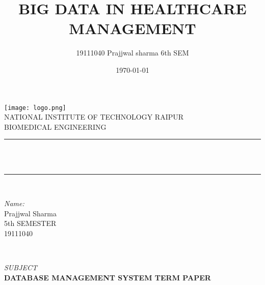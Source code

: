 \documentclass[12pt]{article}
\title{\normalsize BIG DATA IN HEALTHCARE MANAGEMENT}								%
\author{19111040 Prajjwal sharma 6th SEM}								%
\date{\today}											%
\makeatletter
\let\thetitle\@title
\makeatother
\begin{document}

\begin{titlepage}
	\centering
    \vspace*{0.5 cm}
    \texttt{[image: logo.png]}\\[1.0 cm]	%
    \textsc{\Large \newline NATIONAL INSTITUTE OF TECHNOLOGY RAIPUR}\\[2.0 cm]	%
	\textsc{\Large BIOMEDICAL ENGINEERING}
	\\[0.5 cm]				%
	\rule{\linewidth}{0.2 mm} \\[0.4 cm]
	{ \huge \bfseries \thetitle}\\
	\rule{\linewidth}{0.2 mm} \\[1.5 cm]
	
	\begin{minipage}{0.5\textwidth}
		\begin{flushleft} \large
			\emph{Name:}\\
			Prajjwal Sharma\\
            5th SEMESTER\\
            19111040\\
			\end{flushleft}
			\end{minipage}~
			\begin{minipage}{0.4\textwidth}
            
			\begin{flushright} \large
			\emph{SUBJECT} \\
				\bf{DATABASE MANAGEMENT SYSTEM TERM PAPER}
		\end{flushright}
        
	\end{minipage}\\[2 cm]
	
	

    
    
    
	
\end{titlepage}





\end{document}
